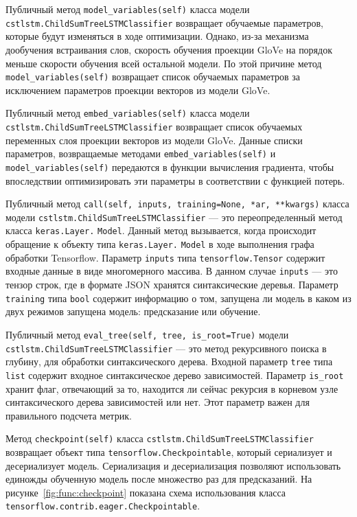 Публичный метод \texttt{model\_variables(self)} класса модели \texttt{cst\-lstm.Chi\-ldSum\-TreeLSTMClassifier} возвращает обучаемые параметров, которые будут изменяться в ходе оптимизации. Однако, из-за механизма дообучения встраивания слов, скорость обучения проекции GloVe на порядок меньше скорости обучения всей остальной модели. По этой причине метод \texttt{model\_va\-riables(self)} возвращает список обучаемых параметров за исключением параметров проекции векторов из модели GloVe.

Публичный метод \texttt{embed\_variables(self)} класса модели \texttt{cstls\-tm.ChildSum\-TreeLSTMClassifier} возвращает список обучаемых переменных слоя проекции векторов из модели GloVe. Данные списки параметров, возвращаемые методами \texttt{embed\_variables(self)} и \texttt{model\_var\-iables(self)} передаются в функции вычисления градиента, чтобы впоследствии оптимизировать эти параметры в соответствии с функцией потерь.

Публичный метод \texttt{call(self, inputs, training=None, *ar, **kwargs)} класса модели \texttt{cstlstm.ChildSumTreeLSTMClassifier} --- это переопределенный метод класса \texttt{keras.Layer.} \texttt{Model}. Данный метод вызывается, когда происходит обращение к объекту типа \texttt{keras.Layer.} \texttt{Model} в ходе выполнения графа обработки Tensorflow. Параметр \texttt{inputs} типа \texttt{tensorflow.Tensor} содержит входные данные в виде многомерного массива. В данном случае \texttt{inputs} --- это тензор строк, где в формате JSON хранятся синтаксические деревья. Параметр \texttt{training} типа \texttt{bool} содержит информацию о том, запущена ли модель в каком из двух режимов запущена модель: предсказание или обучение.

Публичный метод \texttt{eval\_tree(self, tree, is\_root=True)} модели  \texttt{cst\-lstm.ChildSumTreeLSTMClassifier} --- это метод рекурсивного поиска в глубину, для обработки синтаксического дерева. Входной параметр \texttt{tree} типа \texttt{list} содержит входное синтаксическое дерево зависимостей. Параметр \texttt{is\_root} хранит флаг, отвечающий за то, находится ли сейчас рекурсия в корневом узле синтаксического дерева зависимостей или нет. Этот параметр важен для правильного подсчета метрик.

Метод \texttt{checkpoint(self)} класса \texttt{cstlstm.Child\-SumTreeLST\-MClassifier} возвращает объект типа \texttt{tensorflow.Checkpointable}, который сериализует и десериализует модель. Сериализация и десериализация позволяют использовать единожды обученную модель после множество раз для предсказаний. На рисунке~\ref{fig:func:checkpoint} показана схема использования класса \texttt{tensorflow.contrib.eager.Checkpointable}.

